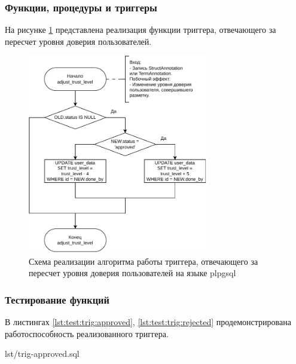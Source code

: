 \newpage

\subsubsection{Функции, процедуры и триггеры}

На рисунке \ref{fig:trig-impl} представлена реализация функции триггера, отвечающего за пересчет уровня доверия пользователей.

\begin{figure}[H]
	\centering
	\includegraphics[width=0.7\textwidth]{diag/tech-trig-v4.pdf}
	\caption{Схема реализации алгоритма работы триггера, отвечающего за пересчет уровня доверия пользователей на языке plpgsql}
	\label{fig:trig-impl}
\end{figure}

\subsubsection{Тестирование функций}


В листингах \ref{lst:test:trig:approved}, \ref{lst:test:trig:rejected} продемонстрирована работоспособность реализованного триггера.

\begin{code}
    \begin{lstinputlisting}[
            label={lst:test:trig:approved},
            caption={Увеличение уровня доверия пользователя при одобрении его разметки},
        ]{lst/trig-approved.sql}
    \end{lstinputlisting}
\end{code}

